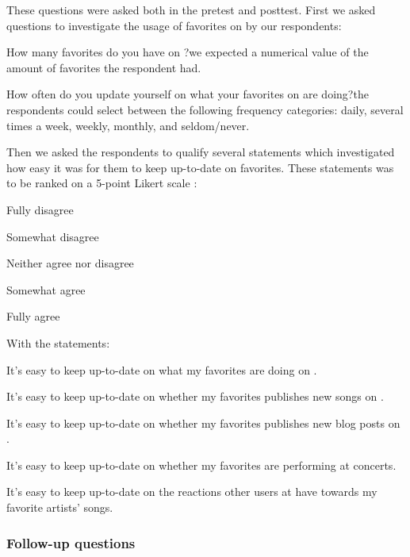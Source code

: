 These questions were asked both in the pretest and posttest. First we asked
questions to investigate the usage of favorites on \urort{} by our
respondents:

\begin{items}
  \item How many favorites do you have on \urort{}?\dash{}we expected
    a numerical value of the amount of favorites the respondent had.
  \item How often do you update yourself on what your favorites on \urort{}
    are doing?\dash{}the respondents could select between the following
    frequency categories: daily, several times a week, weekly, monthly,
    and seldom/never.
\end{items}

Then we asked the respondents to qualify several statements which investigated
how easy it was for them to keep up-to-date on favorites.
These statements
was to be ranked on a 5-point Likert scale \citep{likert32}:

\begin{items}
  \item Fully disagree
  \item Somewhat disagree
  \item Neither agree nor disagree
  \item Somewhat agree
  \item Fully agree
\end{items}

With the statements:

\begin{items}
  \item It's easy to keep up-to-date on what my favorites are doing
    on \urort{}.
  \item It's easy to keep up-to-date on whether my favorites publishes
    new songs on \urort{}.
  \item It's easy to keep up-to-date on whether my favorites publishes
    new blog posts on \urort{}.
  \item It's easy to keep up-to-date on whether my favorites are
    performing at concerts.
  \item It's easy to keep up-to-date on the reactions other users at
    \urort{} have towards my favorite artists' songs.
\end{items}

\subsubsection{Follow-up questions}

